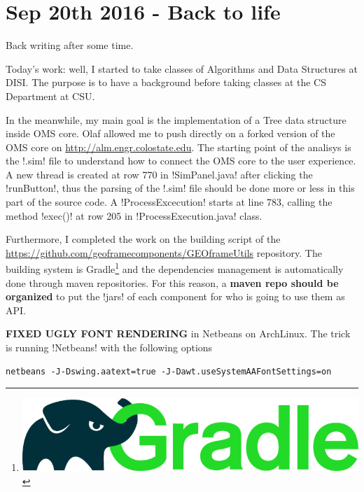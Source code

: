 \section{Sep 20th 2016 - Back to life}

Back writing after some time.

Today's work: well, I started to take classes of Algorithms and Data
Structures at DISI. The purpose is to have a background before taking
classes at the CS Department at CSU.\par\medskip

In the meanwhile, my main goal is the implementation of a Tree data
structure inside OMS core. Olaf allowed me to push directly on a
forked version of the OMS core on
\url{http://alm.engr.colostate.edu}. The starting point of the
analisys is the \inline!.sim! file to understand how to connect the
OMS core to the user experience. A new thread is created at row 770 in
\inline!SimPanel.java! after clicking the \inline!runButton!, thus the
parsing of the \inline!.sim! file should be done more or less in this
part of the source code. A \inline!ProcessExcecution! starts at line
783, calling the method \inline!exec()! at row 205 in
\inline!ProcessExecution.java! class.

Furthermore, I completed the work on the building script of the
\url{https://github.com/geoframecomponents/GEOframeUtils}
repository. The building system is
Gradle\thanks{\includegraphics{gradle.png}} and the dependencies
management is automatically done through maven repositories. For this
reason, a \textbf{maven repo should be organized} to put the
\inline!jars! of each component for who is going to use them as
API.\par\medskip

\textbf{FIXED UGLY FONT RENDERING} in Netbeans on ArchLinux. The trick
is running \inline!Netbeans! with the following options

\begin{lstlisting}[style=bashStyle]
  netbeans -J-Dswing.aatext=true -J-Dawt.useSystemAAFontSettings=on
\end{lstlisting}%
